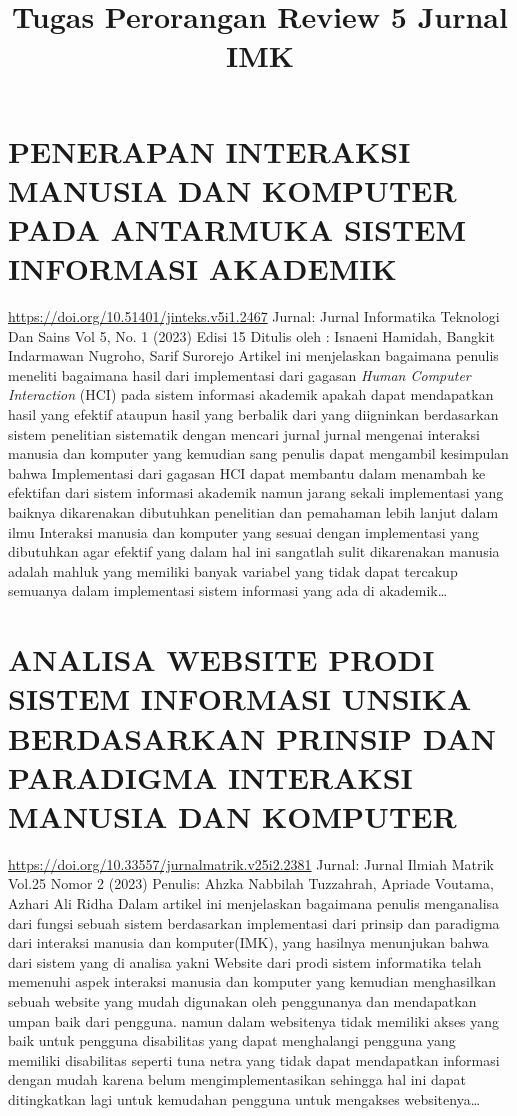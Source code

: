 \documentclass[a4paper, 12pt]{article}
\title{\textbf{Tugas Perorangan}\linebreak
\textbf{Review 5 Jurnal IMK}\linebreak}
\date{}
\begin{document}


\tableofcontents
\thispagestyle{empty}
\pagebreak
\clearpage
\setcounter{page}{1}

\section{PENERAPAN INTERAKSI MANUSIA DAN KOMPUTER PADA ANTARMUKA SISTEM INFORMASI AKADEMIK}
\url{https://doi.org/10.51401/jinteks.v5i1.2467}\newline
Jurnal: Jurnal Informatika Teknologi Dan Sains Vol 5, No. 1 (2023) Edisi 15\newline
Ditulis oleh : Isnaeni Hamidah, Bangkit Indarmawan Nugroho, Sarif Surorejo\newline
Artikel ini menjelaskan bagaimana penulis meneliti bagaimana hasil dari implementasi dari gagasan \emph{Human Computer Interaction} (HCI) pada sistem informasi akademik apakah dapat mendapatkan hasil yang efektif ataupun hasil yang berbalik dari yang diigninkan berdasarkan sistem penelitian sistematik dengan mencari jurnal jurnal mengenai interaksi manusia dan komputer yang kemudian sang penulis dapat mengambil kesimpulan bahwa Implementasi dari gagasan HCI dapat membantu dalam menambah ke efektifan dari sistem informasi akademik namun jarang sekali implementasi yang baiknya dikarenakan dibutuhkan penelitian dan pemahaman lebih lanjut dalam ilmu Interaksi manusia dan komputer yang sesuai dengan implementasi yang dibutuhkan agar efektif yang dalam hal ini sangatlah sulit dikarenakan manusia adalah mahluk yang memiliki banyak variabel yang tidak dapat tercakup semuanya dalam implementasi sistem informasi yang ada di akademik\dots
\section{ANALISA WEBSITE PRODI SISTEM INFORMASI UNSIKA BERDASARKAN PRINSIP DAN PARADIGMA INTERAKSI MANUSIA DAN KOMPUTER}
\url{https://doi.org/10.33557/jurnalmatrik.v25i2.2381}\newline
Jurnal: Jurnal Ilmiah Matrik Vol.25 Nomor 2 (2023)\newline
Penulis: Ahzka Nabbilah Tuzzahrah, Apriade Voutama, Azhari Ali Ridha\newline
Dalam artikel ini menjelaskan bagaimana penulis menganalisa dari fungsi sebuah sistem berdasarkan implementasi dari prinsip dan paradigma dari interaksi manusia dan komputer(IMK), yang hasilnya menunjukan bahwa dari sistem yang di analisa yakni Website dari prodi sistem informatika telah memenuhi aspek interaksi manusia dan komputer yang kemudian menghasilkan sebuah website yang mudah digunakan oleh penggunanya dan mendapatkan umpan baik dari pengguna. namun dalam websitenya tidak memiliki akses yang baik untuk pengguna disabilitas yang dapat menghalangi pengguna yang memiliki disabilitas seperti tuna netra yang tidak dapat mendapatkan informasi dengan mudah karena belum mengimplementasikan sehingga hal ini dapat ditingkatkan lagi untuk kemudahan pengguna untuk mengakses websitenya\dots
\end{document}
